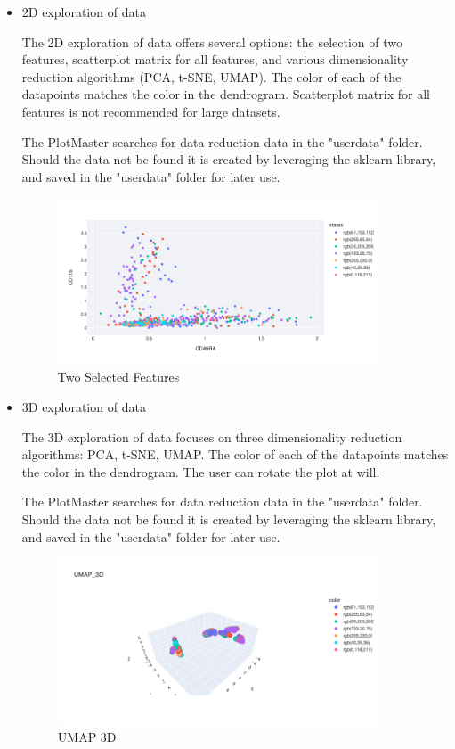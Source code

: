 \begin{itemize}
    \item 2D exploration of data
    
    The 2D exploration of data offers several options: the selection of two features, scatterplot matrix for all features, and various dimensionality reduction algorithms (PCA, t-SNE, UMAP). The color of each of the datapoints matches the color in the dendrogram. Scatterplot matrix for all features is not recommended for large datasets. 
    
    The PlotMaster searches for data reduction data in the "user\textunderscore data" folder. Should the data not be found it is created by leveraging the sklearn library, and saved in the "user\textunderscore data" folder for later use. 
    
    \begin{figure}[h!]
        \centering
        \includegraphics[width=0.9\textwidth]{Figures/twofeat.png}
        \caption{Two Selected Features}
        \label{fig:twofeat}
    \end{figure}

    \item 3D exploration of data
    
    The 3D exploration of data focuses on three dimensionality reduction algorithms: PCA, t-SNE, UMAP. The color of each of the datapoints matches the color in the dendrogram. The user can rotate the plot at will.
    
    The PlotMaster searches for data reduction data in the "user\textunderscore data" folder. Should the data not be found it is created by leveraging the sklearn library, and saved in the "user\textunderscore data" folder for later use. 
    \begin{figure}[h!]
        \centering
        \includegraphics[width=0.9\textwidth]{Figures/umap3d.png}
        \caption{UMAP 3D}
        \label{fig:umap3d}
    \end{figure}
    
\end{itemize}

